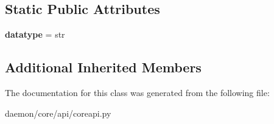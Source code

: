 \subsection*{Static Public Attributes}
\begin{DoxyCompactItemize}
\item 
\hypertarget{classcore_1_1api_1_1coreapi_1_1_core_tlv_data_string_a80e90c51c1821a7c17f540a42555f9a4}{{\bfseries datatype} = str}\label{classcore_1_1api_1_1coreapi_1_1_core_tlv_data_string_a80e90c51c1821a7c17f540a42555f9a4}

\end{DoxyCompactItemize}
\subsection*{Additional Inherited Members}


The documentation for this class was generated from the following file\+:\begin{DoxyCompactItemize}
\item 
daemon/core/api/coreapi.\+py\end{DoxyCompactItemize}
